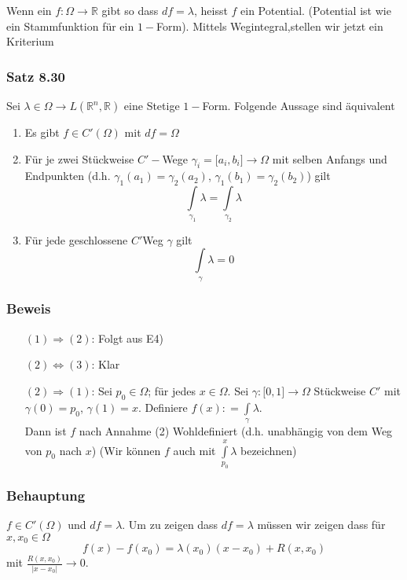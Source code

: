 Wenn ein $f:\Omega\rightarrow\mathbb{R}$ gibt so dass $df=\lambda$, heisst $f$ ein Potential. (Potential ist wie ein Stammfunktion für ein $1-$Form). Mittels Wegintegral,stellen wir jetzt ein Kriterium

\subsubsection*{Satz 8.30}
Sei $\lambda\in\Omega\rightarrow L\left( \mathbb{R}^n,\mathbb{R}\right)$ eine Stetige $1-$Form. Folgende Aussage sind äquivalent
\begin{enumerate}
\item Es gibt $f\in C'\left( \Omega\right)$ mit $df=\Omega$
\item Für je zwei Stückweise $C'-$Wege $\gamma_i=\lbrack a_i,b_i\rbrack\rightarrow\Omega$ mit selben Anfangs und Endpunkten (d.h. $\gamma_1\left( a_1\right)=\gamma_2\left(a_2\right)$, $\gamma_1\left( b_1\right)=\gamma_2\left(b_2\right)$) gilt \[\int\limits_{{\gamma _1}} \lambda   = \int\limits_{{\gamma _2}} \lambda  \]
\item Für jede geschlossene $C'$Weg $\gamma$ gilt \[\int\limits_\gamma  \lambda   = 0\]
\end{enumerate} 

\subsubsection*{Beweis} 
\begin{enumerate}
\item[$(1)\Rightarrow (2)$:] Folgt aus E4) 
\item[$(2)\Leftrightarrow (3)$:] Klar
\item[$(2)\Rightarrow (1)$:] Sei $p_0\in\Omega$; für jedes $x\in\Omega$. Sei $\gamma:\lbrack 0,1\rbrack\rightarrow\Omega$ Stückweise $C'$ mit $\gamma(0)=p_0$, $\gamma(1)=x$. Definiere $f(x): = \int\limits_\gamma  \lambda $.\\

Dann ist $f$ nach Annahme (2) Wohldefiniert (d.h. unabhängig von dem Weg von $p_0$ nach $x$) (Wir können $f$ auch mit $\int\limits_{{p_0}}^x \lambda  $ bezeichnen)
\end{enumerate}

\subsubsection*{Behauptung}
$f\in C'\left( \Omega\right)$ und $df=\lambda$. Um zu zeigen dass $df=\lambda$ müssen wir zeigen dass für $x,x_0\in\Omega$
$$f\left(x\right)-f\left(x_0\right)=\lambda\left(x_0\right)\left( x-x_0\right)+R\left( x,x_0\right)$$ mit $\frac{R\left( x,x_0\right)}{\left| x-x_0\right|}\rightarrow 0$.\\

